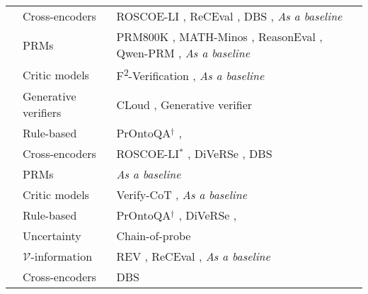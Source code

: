 \begin{table*}[tb]
\begin{tabular}{>{\centering\arraybackslash}p{}  >{\centering\arraybackslash}p{}  p{}}
    & Cross-encoders &  ROSCOE-LI \citep{DBLP:conf/iclr/GolovnevaCPCZFC23}, ReCEval \citep{prasad-etal-2023-receval},  DBS \citep{zhu2024deductivebeamsearchdecoding}, \textit{As a baseline} \citep{jacovi-etal-2024-chain} \\ 
    & PRMs &  PRM800K \citep{DBLP:conf/iclr/LightmanKBEBLLS24}, MATH-Minos \citep{gao2024llmcriticshelpcatch}, ReasonEval \citep{xia2025evaluatingmathematicalreasoningaccuracy}, Qwen-PRM \citep{zhang2025lessonsdevelopingprocessreward}, \textit{As a baseline} \citep[\textit{inter alia.}]{zheng2024processbenchidentifyingprocesserrors, NEURIPS2024_d81cb1f4, xia2025evaluatingmathematicalreasoningaccuracy, song2025prmbenchfinegrainedchallengingbenchmark} \\ 
    & Critic models & F\textsuperscript{2}-Verification \citep{wang-etal-2024-boosting-language}, \textit{As a baseline} \citep[\textit{inter alia.}]{NEURIPS2023_72393bd4, jacovi-etal-2024-chain, zheng2024processbenchidentifyingprocesserrors, song2025prmbenchfinegrainedchallengingbenchmark} \\
    & Generative verifiers & CLoud \citep{ankner2024critiqueoutloudrewardmodels}, Generative verifier \citep{zhang2024generativeverifiersrewardmodeling}\\
    \midrule
\multirow{1}{*}{\textbf{Coherence}}
    & Rule-based &  PrOntoQA$^\dagger$ \citep{PrOntoQA}, \citet{nguyen-etal-2024-direct} \\
    & Cross-encoders & ROSCOE-LI$^*$ \citep{DBLP:conf/iclr/GolovnevaCPCZFC23}, DiVeRSe \citep{li-etal-2023-making}, DBS \citep{zhu2024deductivebeamsearchdecoding} \\
    & PRMs &  \textit{As a baseline} \citep{wang-etal-2024-math} \\
    & Critic models &  Verify-CoT \citep{NEURIPS2023_72393bd4}, \textit{As a baseline} \citep{song2025prmbenchfinegrainedchallengingbenchmark} \\  
\midrule
\multirow{1}{*}{\textbf{Utility}} 
    & Rule-based &  PrOntoQA$^\dagger$ \citep{PrOntoQA},  DiVeRSe \citep{li-etal-2023-making},  \citet{nguyen-etal-2024-direct} \\ 
    & Uncertainty & Chain-of-probe \citep{wang2024chainofprobeexamingnecessityaccuracy} \\
    & $\mathcal{V}$-information &   REV \citep{chen-etal-2023-rev},  ReCEval \citep{prasad-etal-2023-receval}, \textit{As a baseline} \citep{yao-barbosa-2024-accurate} \\ 
    & Cross-encoders & DBS \citep{zhu2024deductivebeamsearchdecoding} \\

\end{tabular}
\end{table*}
